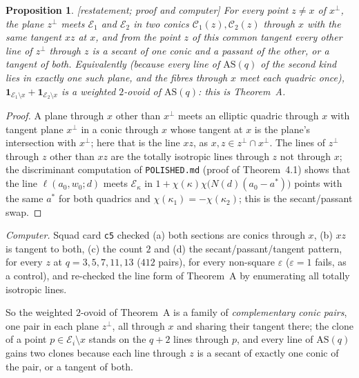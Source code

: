 \documentclass[11pt]{amsart}
\newtheorem{proposition}[theorem]{Proposition}
\theoremstyle{definition}
\theoremstyle{remark}
\newcommand{\cC}{\mathcal{C}}
\newcommand{\cE}{\mathcal{E}}
\newcommand{\status}[1]{\textup{[#1]}}
\begin{document}
\begin{proposition}\label{prop:thmA}
\status{restatement; proof and computer} For every point $z\ne x$ of $x^\perp$, the plane $z^\perp$ meets $\cE_1$ and
$\cE_2$ in two conics $\cC_1(z),\cC_2(z)$ through $x$ with the same tangent $xz$ at $x$, and from the point $z$ of
this common tangent every other line of $z^\perp$ through $z$ is a secant of one conic and a passant of the other,
or a tangent of both. Equivalently (because every line of $\mathrm{AS}(q)$ of the second kind lies in exactly one
such plane, and the fibres through $x$ meet each quadric once), $\mathbf 1_{\cE_1\setminus x}+\mathbf 1_{\cE_2\setminus x}$
is a weighted $2$-ovoid of $\mathrm{AS}(q)$: this is Theorem~A.
\end{proposition}
\begin{proof}
A plane through $x$ other than $x^\perp$ meets an elliptic quadric through $x$ with tangent plane $x^\perp$ in a
conic through $x$ whose tangent at $x$ is the plane's intersection with $x^\perp$; here that is the line $xz$, as
$x,z\in z^\perp\cap x^\perp$. The lines of $z^\perp$ through $z$ other than $xz$ are the totally isotropic lines
through $z$ not through $x$; the discriminant computation of \texttt{POLISHED.md} (proof of Theorem~4.1) shows that
the line $\ell(a_0,w_0;d)$ meets $\cE_\kappa$ in $1+\chi(\kappa)\chi\bigl(N(d)(a_0-a^*)\bigr)$ points with the same
$a^*$ for both quadrics and $\chi(\kappa_1)=-\chi(\kappa_2)$; this is the secant/passant swap.
\end{proof}

\emph{Computer.} Squad card \texttt{c5} checked (a) both sections are conics through $x$, (b) $xz$ is tangent to both,
(c) the count $2$ and (d) the secant/passant/tangent pattern, for every $z$ at $q=3,5,7,11,13$ ($412$ pairs), for
every non-square $\varepsilon$ ($\varepsilon=1$ fails, as a control), and re-checked the line form of Theorem~A by
enumerating all totally isotropic lines.

So the weighted $2$-ovoid of Theorem~A is a family of \emph{complementary conic pairs}, one pair in each plane
$z^\perp$, all through $x$ and sharing their tangent there; the clone of a point $p\in\cE_i\setminus x$ stands on the
$q+2$ lines through $p$, and every line of $\mathrm{AS}(q)$ gains two clones because each line through $z$ is a secant
of exactly one conic of the pair, or a tangent of both.
\end{document}
